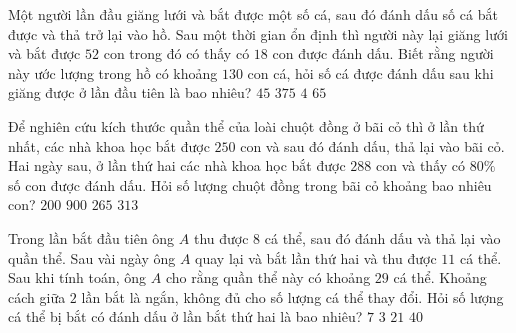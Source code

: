 \begin{ex}
	Một người lần đầu giăng lưới và bắt được một số cá, sau đó đánh dấu số cá bắt được và thả trở lại vào hồ. Sau một thời gian ổn định thì người này lại giăng lưới và bắt được $52$ con trong đó có thấy có $18$ con được đánh dấu. Biết rằng người này ước lượng trong hồ có khoảng $130$ con cá, hỏi số cá được đánh dấu sau khi giăng được ở lần đầu tiên là bao nhiêu?
	\choice
	{\True $45 $}
	{$375 $}
	{$4 $}
	{$65 $}
\end{ex}
\begin{ex}
	Để nghiên cứu kích thước quần thể của loài chuột đồng ở bãi cỏ thì ở lần thứ nhất, các nhà khoa học bắt được $250$ con và sau đó đánh dấu, thả lại vào bãi cỏ. Hai ngày sau, ở lần thứ hai các nhà khoa học bắt được $288$ con và thấy có $80\%$ số con được đánh dấu. Hỏi số lượng chuột đồng trong bãi cỏ khoảng bao nhiêu con? 
	\choice
	{$200 $}
	{$900 $}
	{$265 $}
	{\True $313 $}
\end{ex}
\begin{ex}
	Trong lần bắt đầu tiên ông $A$ thu được $ 8 $ cá thể, sau đó đánh dấu và thả lại vào quần thể. Sau vài ngày ông $A$ quay lại và bắt lần thứ hai và thu được $ 11 $ cá thể. Sau khi tính toán, ông $A$ cho rằng quần thể này có khoảng $ 29 $ cá thể. Khoảng cách giữa $ 2 $ lần bắt là ngắn, không đủ cho số lượng cá thể thay đổi. Hỏi số  lượng cá thể bị bắt có đánh dấu ở lần bắt thứ hai là bao nhiêu?
	\choice
	{$7 $}
	{\True $3 $}
	{$21 $}
	{$40 $}
\end{ex}

